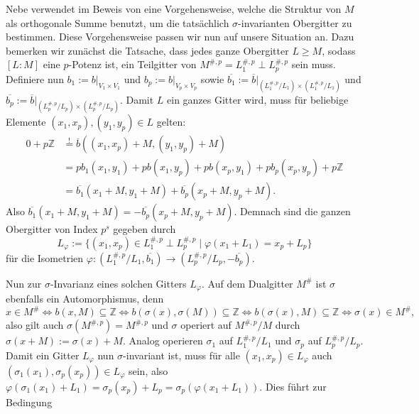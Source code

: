 \documentclass[12pt,a4paper,halfparskip,headsepline,bibtotocnumbered]{scrreprt}
\theoremstyle{nummermitklammern}
\theoremstyle{nonumberbreak}
\newcommand{\Z}{\mathbb{Z}}
\begin{document}
Nebe verwendet im Beweis von \cite[Theorem (5.9)]{nebe} eine Vorgehensweise, welche die Struktur von $M$ als orthogonale Summe benutzt, um die tatsächlich $\sigma$-invarianten Obergitter zu bestimmen. Diese Vorgehensweise passen wir nun auf unsere Situation an. Dazu bemerken wir zunächst die Tatsache, dass jedes ganze Obergitter $L \geq M$, sodass $[L : M]$ eine $p$-Potenz ist, ein Teilgitter von $M^{\#,p} = L_1^{\#,p} \perp L_p^{\#,p}$ sein muss. Definiere nun $b_1 := b \vert_{V_1 \times V_1}$ und $b_p := b \vert_{V_p \times V_p}$ sowie $\overline{b_1} := \overline{b}\vert_{(L_1^{\#,p} / L_1) \times (L_1^{\#,p} / L_1)}$ und $\overline{b_p} := \overline{b}\vert_{(L_p^{\#,p} / L_p) \times (L_p^{\#,p} / L_p)}$. Damit $L$ ein ganzes Gitter wird, muss für beliebige Elemente $(x_1, x_p), (y_1, y_p) \in L$ gelten:
\begin{align*}
	0 + p\Z &\stackrel{!}{=} \overline{b}((x_1,x_p) + M, (y_1, y_p) + M)\\
	&= pb_1(x_1,y_1) + pb(x_1, y_p) + pb(x_p, y_1) + pb_p(x_p, y_p) + p\Z\\
	&= \overline{b_1}(x_1+M, y_1 + M) + \overline{b_p}(x_p+M, y_p+M).
\end{align*}
Also $\overline{b_1}(x_1+M, y_1+M) = - \overline{b_p}(x_p+M, y_p+M)$. Demnach sind die ganzen Obergitter von Index $p^s$ gegeben durch
\begin{equation*}
	L_\varphi := \lbrace (x_1,x_p) \in L_1^{\#,p} \perp L_p^{\#,p} \mid \varphi(x_1+L_1) = x_p + L_p \rbrace	
\end{equation*}
für die Isometrien $\varphi : (L_1^{\#,p} / L_1, \overline{b_1}) \rightarrow (L_p^{\#,p} / L_p, -\overline{b_p})$.\par
Nun zur $\sigma$-Invarianz eines solchen Gitters $L_\varphi$. Auf dem Dualgitter $M^\#$ ist $\sigma$ ebenfalls ein Automorphismus, denn
\begin{equation*}
	x \in M^\# \Leftrightarrow b(x,M) \subseteq \Z \Leftrightarrow b(\sigma(x), \sigma(M)) \subseteq \Z \Leftrightarrow b(\sigma(x), M) \subseteq \Z \Leftrightarrow \sigma(x) \in M^\#,
\end{equation*}
also gilt auch $\sigma(M^{\#,p}) = M^{\#,p}$ und $\sigma$ operiert auf $M^{\#,p}/M$ durch\linebreak
$\sigma(x+M) := \sigma(x) + M$. Analog operieren $\sigma_1$ auf $L_1^{\#,p}/L_1$ und $\sigma_p$ auf $L_p^{\#,p}/L_p$. Damit ein Gitter $L_\varphi$ nun $\sigma$-invariant ist, muss für alle $(x_1,x_p) \in L_\varphi$ auch $(\sigma_1(x_1), \sigma_p(x_p)) \in L_\varphi$ sein, also $\varphi(\sigma_1(x_1) + L_1) = \sigma_p(x_p) + L_p = \sigma_p(\varphi(x_1 + L_1))$. Dies führt zur Bedingung
\end{document}
